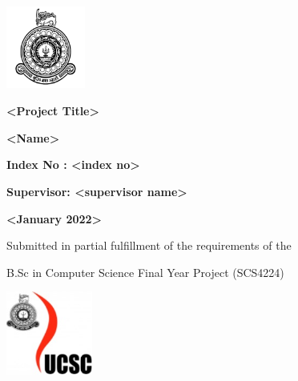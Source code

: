 
\title{}
\date{}
\author{}

\begin{titlepage}
    \begin{center}
    \includegraphics[width=1.02113in,height=1.07937in]{logos/uoc.png}
    \vspace{1.5cm}

    {\fontsize{32pt}{38.4pt}\selectfont
    \textbf{\textless Project Title\textgreater}
    }
    \vspace{1.5cm}
    
    {\fontsize{18pt}{21.6pt}\selectfont
    \textbf{\textless Name\textgreater{}}
    }
    
    {\fontsize{18pt}{21.6pt}\selectfont
    \textbf{Index No : \textless index no\textgreater{}}
    }
    \vspace{2.5cm}

    {\fontsize{18pt}{21.6pt}\selectfont
    \textbf{Supervisor: \textless supervisor name\textgreater{}}
    }
    \vspace{2.5cm}
    
    {\fontsize{18pt}{21.6pt}\selectfont
    \textbf{\textless January 2022\textgreater{}}
    }
    \vspace{2.5cm}
    
    {\fontsize{16pt}{19.2pt}\selectfont
    Submitted in partial fulfillment of the requirements of the
    
    B.Sc in Computer Science Final Year Project (SCS4224)
    }
    \vspace{1cm}

    \includegraphics[width=1.12148in,height=1.07484in]{logos/ucsc.jpg}

    \end{center}
    \thispagestyle{empty}
\end{titlepage}

